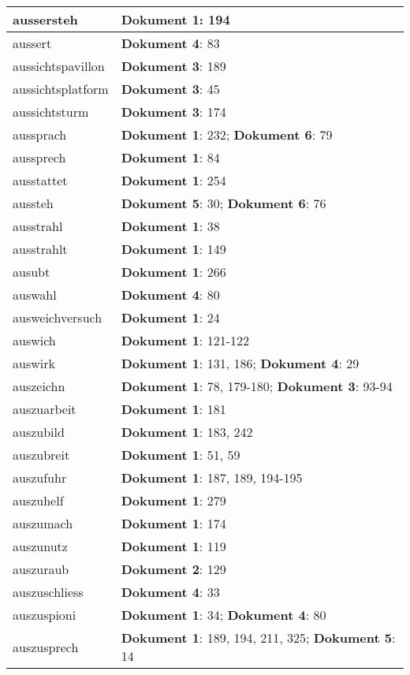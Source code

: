 \documentclass[a5paper]{article}
\begin{document}
\begin{longtable}[l]{|l|p{3in}|}
\hline
aussersteh & \textbf{Dokument 1}: 194 \\
\hline
aussert & \textbf{Dokument 4}: 83 \\
\hline
aussichtspavillon & \textbf{Dokument 3}: 189 \\
\hline
aussichtsplatform & \textbf{Dokument 3}: 45 \\
\hline
aussichtsturm & \textbf{Dokument 3}: 174 \\
\hline
aussprach & \textbf{Dokument 1}: 232; \textbf{Dokument 6}: 79 \\
\hline
aussprech & \textbf{Dokument 1}: 84 \\
\hline
ausstattet & \textbf{Dokument 1}: 254 \\
\hline
aussteh & \textbf{Dokument 5}: 30; \textbf{Dokument 6}: 76 \\
\hline
ausstrahl & \textbf{Dokument 1}: 38 \\
\hline
ausstrahlt & \textbf{Dokument 1}: 149 \\
\hline
ausubt & \textbf{Dokument 1}: 266 \\
\hline
auswahl & \textbf{Dokument 4}: 80 \\
\hline
ausweichversuch & \textbf{Dokument 1}: 24 \\
\hline
auswich & \textbf{Dokument 1}: 121-122 \\
\hline
auswirk & \textbf{Dokument 1}: 131, 186; \textbf{Dokument 4}: 29 \\
\hline
auszeichn & \textbf{Dokument 1}: 78, 179-180; \textbf{Dokument 3}: 93-94 \\
\hline
auszuarbeit & \textbf{Dokument 1}: 181 \\
\hline
auszubild & \textbf{Dokument 1}: 183, 242 \\
\hline
auszubreit & \textbf{Dokument 1}: 51, 59 \\
\hline
auszufuhr & \textbf{Dokument 1}: 187, 189, 194-195 \\
\hline
auszuhelf & \textbf{Dokument 1}: 279 \\
\hline
auszumach & \textbf{Dokument 1}: 174 \\
\hline
auszunutz & \textbf{Dokument 1}: 119 \\
\hline
auszuraub & \textbf{Dokument 2}: 129 \\
\hline
auszuschliess & \textbf{Dokument 4}: 33 \\
\hline
auszuspioni & \textbf{Dokument 1}: 34; \textbf{Dokument 4}: 80 \\
\hline
auszusprech & \textbf{Dokument 1}: 189, 194, 211, 325; \textbf{Dokument 5}: 14 \\

\end{longtable}
\end{document}
